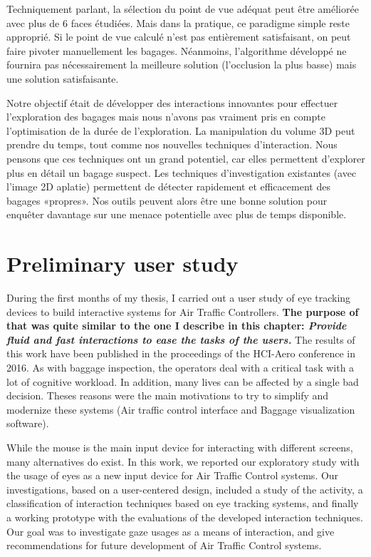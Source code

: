 Techniquement parlant, la sélection du point de vue adéquat peut être améliorée avec plus de 6 faces étudiées. Mais dans la pratique, ce paradigme simple reste approprié. Si le point de vue calculé n'est pas entièrement satisfaisant, on peut faire pivoter manuellement les bagages. Néanmoins, l'algorithme développé ne fournira pas nécessairement la meilleure solution (l'occlusion la plus basse) mais une solution satisfaisante.
\par Notre objectif était de développer des interactions innovantes pour effectuer l'exploration des bagages mais nous n'avons pas vraiment pris en compte l'optimisation de la durée de l'exploration. La manipulation du volume 3D peut prendre du temps, tout comme nos nouvelles techniques d'interaction. Nous pensons que ces techniques ont un grand potentiel, car elles permettent d’explorer plus en détail un bagage suspect. Les techniques d'investigation existantes (avec l'image 2D aplatie) permettent de détecter rapidement et efficacement des bagages «propres». Nos outils peuvent alors être une bonne solution pour enquêter davantage sur une menace potentielle avec plus de temps disponible.


\NewPage

\section{ Preliminary user study }
During the first months of my thesis, I carried out a user study of eye tracking devices to build interactive systems for Air Traffic Controllers. \textbf{ The purpose of that was quite similar to the one I describe in this chapter: \textit{Provide fluid and fast interactions to ease the tasks of the users.} } The results of this work have been published in the proceedings of the HCI-Aero conference in 2016. As with baggage inspection, the operators deal with a critical task with a lot of cognitive workload. In addition, many lives can be affected by a single bad decision. Theses reasons were the main motivations to try to simplify and modernize these systems (Air traffic control interface and Baggage visualization software). 


While the mouse is the main input device for interacting with different screens, many alternatives do exist. In this work, we reported our exploratory study with the usage of
eyes as a new input device for Air Traffic Control systems. Our investigations, based on a user-centered design, included a study of the activity, a classification of interaction
techniques based on eye tracking systems, and finally a working prototype with the evaluations of the developed interaction techniques. Our goal was to investigate gaze usages
as a means of interaction, and give recommendations for future development of Air Traffic Control systems.


